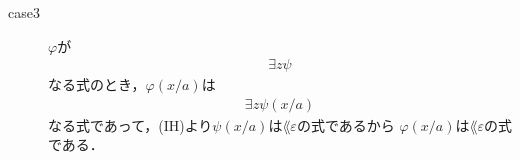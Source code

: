 \begin{metaprf}
\begin{description}
\begin{description}
					\item[case3] $\varphi$が
						\begin{align}
							\exists z \psi
						\end{align}
						なる式のとき，$\varphi(x/a)$は
						\begin{align}
							\exists z \psi(x/a)
						\end{align}
						なる式であって，(IH)より$\psi(x/a)$は$\lang{\varepsilon}$の式であるから
						$\varphi(x/a)$は$\lang{\varepsilon}$の式である．
						\QED
				\end{description}
		\end{description}
	\end{metaprf}
	
	\begin{screen}
		\begin{metathm}
			
		\end{metathm}
	\end{screen}